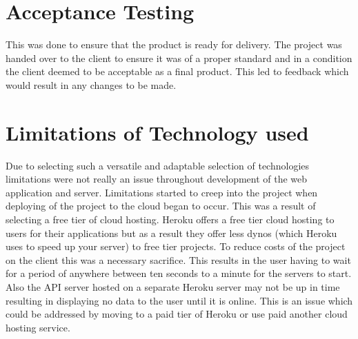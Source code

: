 \section{Acceptance Testing}
This was done to ensure that the product is ready for delivery. The project was handed over to the client to ensure it was of a proper standard and in a condition the client deemed to be acceptable as a final product. This led to feedback which would result in any changes to be made.

\newpage
\section{Limitations of Technology used}
Due to selecting such a versatile and adaptable selection of technologies limitations were not really an issue throughout development of the web application and server. Limitations started to creep into the project when deploying of the project to the cloud began to occur.  This was a result of selecting a free tier of cloud hosting. Heroku offers a free tier cloud hosting to users for their applications but as a result they offer less dynos (which Heroku uses to speed up your server) to free tier projects. To reduce costs of the project on the client this was a necessary sacrifice. This results in the user having to wait for a period of anywhere between ten seconds to a minute for the servers to start. Also the API server hosted on a separate Heroku server may not be up in time resulting in displaying no data to the user until it is online. This is an issue which could be addressed by moving to a paid tier of Heroku or use paid another cloud hosting service.